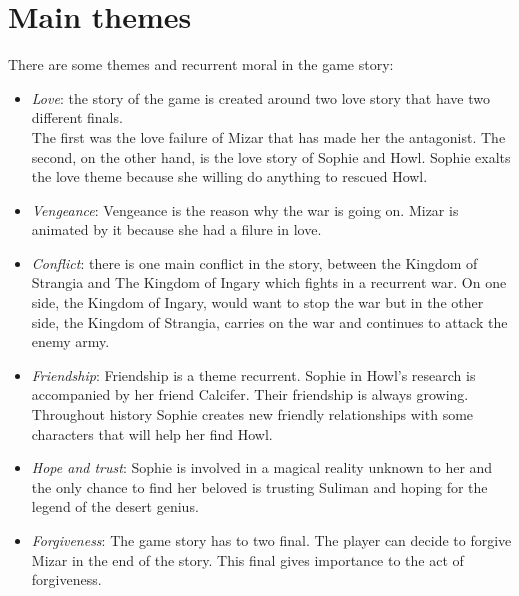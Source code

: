 \section{Main themes}

There are some themes and recurrent moral in the game story:
\begin{itemize}
\item \textit{Love}:
  the story of the game is created around two love story that have two different finals.\\
  The first was the love failure of Mizar that has made her the antagonist.
  The second, on the other hand, is the love story of Sophie and Howl. %
  Sophie exalts the love theme because she willing do anything to rescued Howl.
  
\item \textit{Vengeance}:
  Vengeance is the reason why the war is going on. Mizar is animated by it because she had a filure in love.
  
\item \textit{Conflict}:
  there is one main conflict in the story, between the Kingdom of Strangia and The Kingdom of Ingary which fights in a recurrent war.
  On one side, the Kingdom of Ingary, would want to stop the war but in the other side, the Kingdom of Strangia, carries on the war and continues to attack the enemy army.
  
\item \textit{Friendship}:
  Friendship is a theme recurrent. Sophie in Howl's research is accompanied by her friend Calcifer.
  Their friendship is always growing. Throughout history Sophie creates new friendly relationships with some characters that will help
  her find Howl.

\item \textit{Hope and trust}:
  Sophie is involved in a magical reality unknown to her and the only chance to find her beloved is trusting Suliman and hoping for the legend of the desert genius.
  
\item \textit{Forgiveness}:
  The game story has to two final. The player can decide to forgive Mizar in the end of the story. This final gives importance to the act of forgiveness.

\end{itemize}
